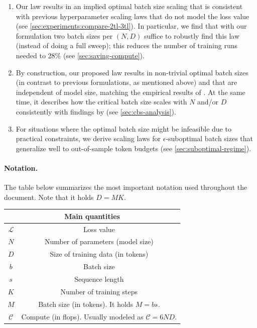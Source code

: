 \documentclass[12pt,a4paper,twoside]{article}
\begin{document}
\begin{enumerate}[label=(\roman*)]
    \item Our law results in an implied optimal batch size scaling that is consistent with previous hyperparameter scaling laws that do not model the loss value (see \cref{sec:experiments:compare-2tl-3tl}). In particular, we find that with our formulation two batch sizes per $(N,D)$ suffice to robustly find this law (instead of doing a full sweep); this reduces the number of training runs needed to 28\% (see \cref{sec:saving-compute}).
    \item By construction, our proposed law results in non-trivial optimal batch sizes (in contrast to previous formulations, as mentioned above) and that are independent of model size, matching the empirical results of  \citet{Li2025}. At the same time, it describes how the critical batch size scales with $N$ and/or $D$ consistently with findings by \citet{Zhang2025} (see \cref{sec:cbs-analysis}).
    \item For situations where the optimal batch size might be infeasible due to practical constraints, we derive scaling laws for $\epsilon$-suboptimal batch sizes that generalize well to out-of-sample token budgets (see \cref{sec:suboptimal-regime}).
\end{enumerate}


\paragraph{Notation.}

The table below summarizes the most important notation used throughout the document. Note that it holds $D=MK$.

\begin{table}[H]
    \label{tab:notation}
    \centering
	\begin{tabular}{ | c | c | } 
		\hline
		\multicolumn{2}{|c|}{Main quantities} \\
		\hline \hline
        $\mathcal{L}$ & Loss value \\
		$N$ & Number of parameters (model size) \\
		$D$ & Size of training data (in tokens) \\
		$b$ & Batch size \\
        $s$ & Sequence length \\
		$K$ & Number of training steps \\
		$M$ & Batch size (in tokens). It holds $M=bs$.\\
        $\mathcal{C}$ & Compute (in flops). Usually modeled as $\mathcal{C}=6ND$. \\
		\hline
	\end{tabular}
\end{table}
\end{document}
